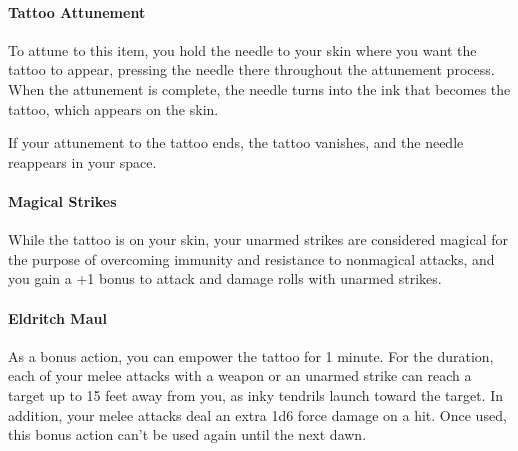 \documentclass[letterpaper,openany,oneside,twocolumn]{book}
\begin{document}
\paragraph*{Tattoo Attunement} To attune to this item, you hold the needle to your skin where you want the tattoo to appear, pressing the needle there throughout the attunement process. When the attunement is complete, the needle turns into the ink that becomes the tattoo, which appears on the skin.

If your attunement to the tattoo ends, the tattoo vanishes, and the needle reappears in your space.

\paragraph*{Magical Strikes} While the tattoo is on your skin, your unarmed strikes are considered magical for the purpose of overcoming immunity and resistance to nonmagical attacks, and you gain a +1 bonus to attack and damage rolls with unarmed strikes.

\paragraph*{Eldritch Maul} As a bonus action, you can empower the tattoo for 1 minute. For the duration, each of your melee attacks with a weapon or an unarmed strike can reach a target up to 15 feet away from you, as inky tendrils launch toward the target. In addition, your melee attacks deal an extra 1d6 force damage on a hit. Once used, this bonus action can't be used again until the next dawn.
\end{document}
